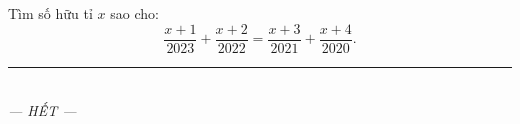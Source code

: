 \documentclass[12pt,a4paper]{article}
\begin{document}
\begin{ex}
Tìm số hữu tỉ $x$ sao cho:
\[ \dfrac{x + 1}{2023} + \dfrac{x + 2}{2022} = \dfrac{x + 3}{2021} + \dfrac{x + 4}{2020}. \]
\end{ex}
\vspace{1.5mm}


\begin{center}
\rule{4cm}{0.4pt}\\
\textit{--- HẾT ---}
\end{center}
\end{document}
